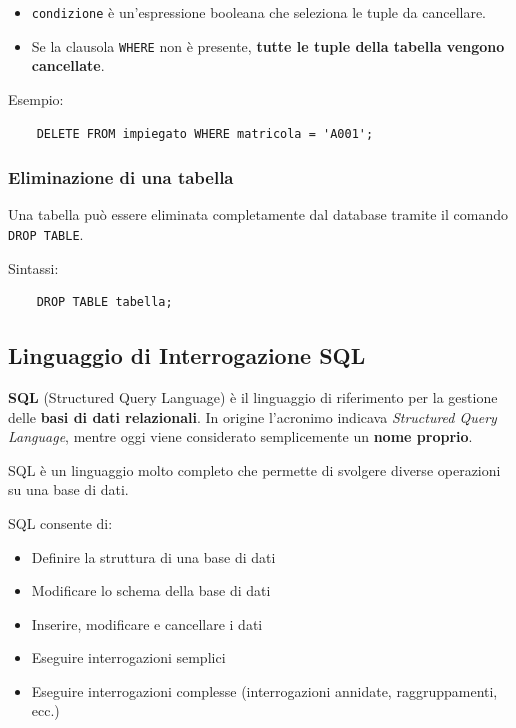 \begin{itemize}
	
	\item \texttt{condizione} è un'espressione booleana che seleziona
	le tuple da cancellare.
	
	\item Se la clausola \texttt{WHERE} non è presente,
	\textbf{tutte le tuple della tabella vengono cancellate}.
	
\end{itemize}

Esempio:

\begin{verbatim}
	DELETE FROM impiegato WHERE matricola = 'A001';
\end{verbatim}

\subsubsection{Eliminazione di una tabella}

Una tabella può essere eliminata completamente dal database tramite
il comando \texttt{DROP TABLE}.

Sintassi:

\begin{verbatim}
	DROP TABLE tabella;
\end{verbatim}

\subsection{Linguaggio di Interrogazione SQL}

\textbf{SQL} (Structured Query Language) è il linguaggio di riferimento per la gestione delle \textbf{basi di dati relazionali}. 
In origine l'acronimo indicava \textit{Structured Query Language}, mentre oggi viene considerato semplicemente un \textbf{nome proprio}.

SQL è un linguaggio molto completo che permette di svolgere diverse operazioni su una base di dati.


SQL consente di:

\begin{itemize}
	\item Definire la struttura di una base di dati
	\item Modificare lo schema della base di dati
	\item Inserire, modificare e cancellare i dati
	\item Eseguire interrogazioni semplici
	\item Eseguire interrogazioni complesse (interrogazioni annidate, raggruppamenti, ecc.)
\end{itemize}

